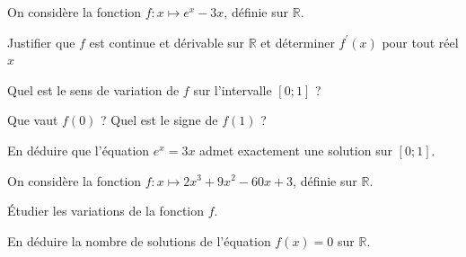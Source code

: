 \documentclass[11pt,a4paper]{article}  %
\begin{document}
\exerciceDS{}

On considère la fonction $f: x \mapsto e^x-3 x$, définie sur $\mathbb{R}$.
\begin{enumMet}
	\item Justifier que $f$ est continue et dérivable sur $\mathbb{R}$ et déterminer $f^{\prime}(x)$ pour tout réel $x$
	\item Quel est le sens de variation de $f$ sur l'intervalle $[0 ; 1]$ ?
	\item Que vaut $f(0)$ ? Quel est le signe de $f(1)$ ?
	\item En déduire que l'équation $e^x=3 x$ admet exactement une solution sur $[0 ; 1]$.
\end{enumMet}


\exerciceDS{}

On considère la fonction $f: x \mapsto 2 x^3+9 x^2-60 x+3$, définie sur $\mathbb{R}$.
\begin{enumMet}
	\item Étudier les variations de la fonction $f$.
	\item En déduire la nombre de solutions de l'équation $f(x)=0$ sur $\mathbb{R}$.
\end{enumMet}

%
%
\end{document}
